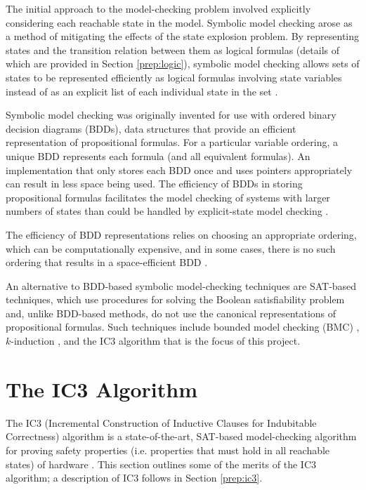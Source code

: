 \documentclass[12pt,a4paper,twoside,openright]{report}
\begin{document}
The initial approach to the model-checking problem involved explicitly
considering each reachable state in the model.
Symbolic model checking arose as a method of mitigating the effects of
the state explosion problem. By representing
states and the transition relation between them as logical formulas
(details of which are provided in Section \ref{prep:logic}),
symbolic model checking allows sets of states to be
represented efficiently as logical formulas involving state variables
instead of as an explicit list of each individual state in the set
\cite{mcmillan92}. 

Symbolic model checking was originally invented for use with ordered
binary decision diagrams (BDDs), data structures that provide an efficient
representation of propositional formulas. For a particular variable
ordering, a unique BDD represents each formula (and all equivalent formulas).
An implementation that only stores each BDD once and uses pointers appropriately
can result in less space being used.
The efficiency of BDDs in storing propositional formulas facilitates the model
checking of systems with larger numbers of states than could be handled
by explicit-state model checking \cite{mcmillan92}.

The efficiency of BDD representations relies on choosing an appropriate
ordering, which can be computationally expensive, and in some cases,
there is no such ordering that results in a space-efficient BDD
\cite{biere99a}.

An alternative to BDD-based symbolic model-checking techniques are SAT-based
techniques, which use procedures for solving the Boolean satisfiability
problem and, unlike BDD-based methods, do not use the canonical representations
of propositional formulas.
Such techniques include bounded model checking (BMC)
\cite{biere99a}, $k$-induction \cite{sheeran00},
and the IC3 algorithm that is the focus of this project.


\section{The IC3 Algorithm}


The IC3 (Incremental Construction of Inductive Clauses for Indubitable Correctness)
algorithm is a state-of-the-art,
SAT-based model-checking
algorithm for proving safety properties (i.e. properties that must hold
in all reachable states) of hardware \cite{bradley11}. This section outlines some of the
merits of the IC3 algorithm; a description of IC3 follows in Section
\ref{prep:ic3}.
\end{document}
